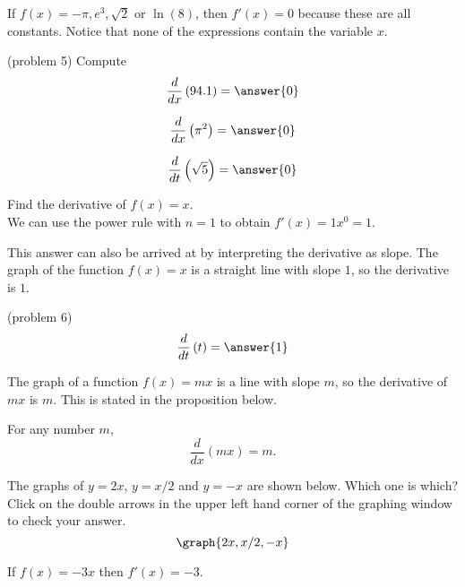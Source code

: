 \documentclass[handout]{ximera}
\begin{document}
\begin{example}[example 5]
If $f(x) = -\pi, e^3, \sqrt 2$ or $\ln(8)$, then $f'(x) = 0$ 
because these are all constants. Notice that none of the expressions contain the variable $x$.
\end{example}



\begin{problem}(problem 5)
Compute
\[
\frac{d}{dx} \left(94.1\right) = \answer{0}
\]

\[
\frac{d}{dx} \left(\pi^2\right) = \answer{0}
\]

\[
\frac{d}{dt} \left( \sqrt 5 \right) = \answer{0}
\]


\end{problem}



\begin{example}[example 6]
Find the derivative of $f(x) = x$.\\
We can use the power rule with $n=1$ to obtain $f'(x) = 1x^0 = 1$. 

\begin{remark}
This answer can also be arrived at by interpreting the derivative as slope. The graph of the function $f(x) = x$ is a straight line with slope $1$,
so the derivative is $1$.  
\end{remark}
\end{example}

\begin{problem}(problem 6)
\[
\frac{d}{dt}\left(t\right) = \answer{1}
\]
\end{problem}

The graph of a function $f(x) = mx$
is a line with slope $m$, so the derivative of $mx$ is $m$. This is stated in the proposition below.
 
\begin{proposition}

For any number $m$,
\[
\frac{d}{dx} (mx) = m.
\]
\end{proposition}


The graphs of $y = 2x$, $y = x/2$ and $y = -x$ are shown below.
Which one is which? Click on the double arrows in the upper left hand corner of the graphing window to check your answer.
\[
\graph{2x, x/2, -x}
\]



\begin{example}[example 7]
If $f(x) = -3x$ then $f'(x) = -3$.
\end{example}
\end{document}
